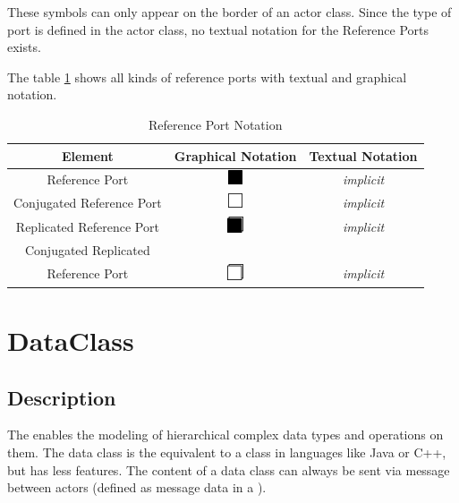 These symbols can only appear on the border of an actor class. Since the type of port is defined 
in the actor class, no textual notation for the Reference Ports exists.

The table \ref{tab:reference_port_notation} shows all kinds of reference ports with textual and graphical notation.

\begin{table}
\caption{Reference Port Notation}
\label{tab:reference_port_notation}
\begin{tabular}{|c|c|c|}
\hline
 \textbf{Element} & \textbf{Graphical Notation} & \textbf{Textual Notation} \\ \hline
 Reference Port & \includegraphics{images/040-ReferencePort.png} & \textit{implicit} \\ \hline
 Conjugated Reference Port & \includegraphics{images/040-ConjugatedReferencePort.png} & \textit{implicit} 
\\ \hline
 Replicated Reference Port & \includegraphics{images/040-ReplicatedReferencePort.png} & \textit{implicit} 
\\ \hline
 Conjugated Replicated \\ Reference Port & 
\includegraphics{images/040-ConjugatedReplicatedReferencePort.png} & \textit{implicit} \\ \hline
\end{tabular}
\end{table}

\section{DataClass}

\subsection{Description}

The  enables the modeling of hierarchical complex data types and operations on them.
The data class is the equivalent to a class in languages like Java or C++, but has less features. The content of a 
data class can always be sent via message between actors (defined as message data in a ).

